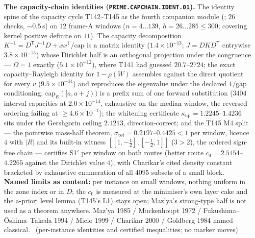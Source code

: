 \documentclass[11pt,a4paper]{article}
\theoremstyle{definition}
\begin{document}
\par\smallskip\noindent\textbf{The capacity-chain identities
(\texttt{PRIME.CAPCHAIN.IDENT.01}).}
The identity spine of the capacity cycle T142--T145 as the fourth companion
module (; $26$ checks, ${\sim}0.5$\,s)
on $12$ frame-A windows ($n=4\ldots139$, $h=26\ldots285\le300$; covering kernel
positive definite on $11$). The capacity decomposition
$K^{-1}=D^{\mathsf T}J^{-1}D+xx^{\mathsf T}/\mathrm{cap}$ is a matrix identity
($1.4\times10^{-13}$; $J=DKD^{\mathsf T}$ entrywise $3.8\times10^{-15}$) whose
Dirichlet half is an orthogonal projection under the congruence --- $\Omega=1$
exactly ($5.1\times10^{-12}$), where T141 had guessed $20.7$--$2724$; the exact
capacity--Rayleigh identity for $1-\rho(W)$ assembles against the direct
quotient for every $v$ ($9.5\times10^{-14}$) and reproduces the eigenvalue under
the declared $1/\mathrm{gap}$ conditioning; $\mathrm{cap}_E([a,a{+}j))$ is a
prefix sum of one forward substitution ($3404$ interval capacities at
$2.0\times10^{-14}$, exhaustive on the median window, the reversed ordering
failing at $\ge4.6\times10^{-1}$); the whitening certificate
$\kappa_{\mathrm{up}}=1.2245$--$1.4236$ sits under the Gershgorin ceiling
$2.1213$, direction-correct; and the T145 M4 split --- the pointwise mass-half
theorem, $\sigma_{\mathrm{tot}}=0.2197$--$0.4425<1$ per window, licence 4 with
$|R|$ and its built-in witness $[[1,-\tfrac12],[-\tfrac12,1]]$ ($3>2$), the
ordered sign-free chain --- certifies S1$'$ per window on both routes (better
route $c_0=2.5154$--$4.2265$ against the Dirichlet value $4$), with Charikar's
cited density constant bracketed by exhaustive enumeration of all $4095$
subsets of a small block.
\textbf{Named limits as content:} per instance on small windows, nothing
uniform in the zone index or in $D$; the $c_0$ is measured at the minimiser's
own layer cake and the a-priori level lemma (T145's L1) stays open; Maz'ya's
strong-type half is not used as a theorem anywhere. Maz'ya 1985 / Muckenhoupt
1972 / Fukushima--\=Oshima--Takeda 1994 / Miclo 1999 / Charikar 2000 / Goldberg
1984 named classical.
\mE\ (per-instance identities and certified inequalities; no marker moves)
\par\smallskip
\end{document}

